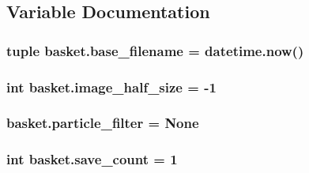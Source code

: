 \subsection{Variable Documentation}
\hypertarget{namespacebasket_aa3007fa12430ca814f5bf5890bb2fb0f}{}
\subsubsection[{base\+\_\+filename}]{\setlength{\rightskip}{0pt plus 5cm}tuple basket.\+base\+\_\+filename = datetime.\+now()}\label{namespacebasket_aa3007fa12430ca814f5bf5890bb2fb0f}
\hypertarget{namespacebasket_a3c352b285b29250f904de2d4ad7fddaa}{}
\subsubsection[{image\+\_\+half\+\_\+size}]{\setlength{\rightskip}{0pt plus 5cm}int basket.\+image\+\_\+half\+\_\+size = -\/1}\label{namespacebasket_a3c352b285b29250f904de2d4ad7fddaa}
\hypertarget{namespacebasket_ae8e523df739d65470eb5eba16867f329}{}
\subsubsection[{particle\+\_\+filter}]{\setlength{\rightskip}{0pt plus 5cm}basket.\+particle\+\_\+filter = None}\label{namespacebasket_ae8e523df739d65470eb5eba16867f329}
\hypertarget{namespacebasket_a3d020674941ec4faf6734391ca082c40}{}
\subsubsection[{save\+\_\+count}]{\setlength{\rightskip}{0pt plus 5cm}int basket.\+save\+\_\+count = 1}\label{namespacebasket_a3d020674941ec4faf6734391ca082c40}
